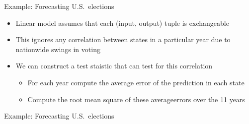 \begin{frame}{Example: Forecasting U.S.\ elections}
  \begin{itemize}
    \item Linear model assumes that each (input, output) tuple is exchangeable
    \vspace{\baselineskip}
    \pause
    \item This ignores any correlation between states in a particular year due to nationwide swings in voting
    \vspace{\baselineskip}
    \pause
    \item We can construct a test staistic that can test for this correlation
    \begin{itemize}
      \item For each year compute the average error of the prediction in each state
      \item Compute the root mean square of these averageerrors over the 11 years
    \end{itemize}
  \end{itemize}
\end{frame}

\begin{frame}{Example: Forecasting U.S.\ elections}
  \begin{center}
  \end{center}
\end{frame}

